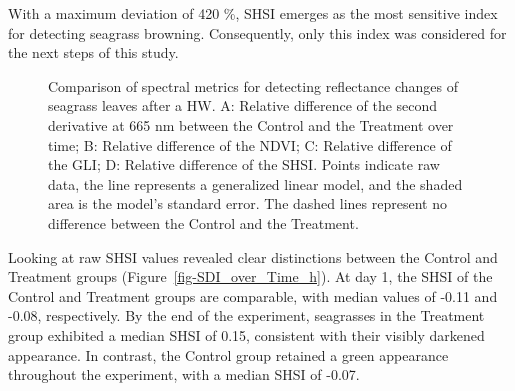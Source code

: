\documentclass[
  letterpaper,
  11pt,
  english,
  singlespacing,
  headsepline]{MastersDoctoralThesis}
\begin{document}
\begin{spacing}{1.5}
With a maximum deviation of 420 \%, SHSI emerges as the most sensitive
index for detecting seagrass browning. Consequently, only this index was
considered for the next steps of this study.

\begin{figure}


\caption{\label{fig-Exp_Spectral_indices_h}Comparison of spectral
metrics for detecting reflectance changes of seagrass leaves after a HW.
A: Relative difference of the second derivative at 665 nm between the
Control and the Treatment over time; B: Relative difference of the NDVI;
C: Relative difference of the GLI; D: Relative difference of the SHSI.
Points indicate raw data, the line represents a generalized linear
model, and the shaded area is the model's standard error. The dashed
lines represent no difference between the Control and the Treatment.}

\end{figure}%

Looking at raw SHSI values revealed clear distinctions between the
Control and Treatment groups (Figure~\ref{fig-SDI_over_Time_h}). At day
1, the SHSI of the Control and Treatment groups are comparable, with
median values of -0.11 and -0.08, respectively. By the end of the
experiment, seagrasses in the Treatment group exhibited a median SHSI of
0.15, consistent with their visibly darkened appearance. In contrast,
the Control group retained a green appearance throughout the experiment,
with a median SHSI of -0.07.


\end{spacing}
\end{document}
